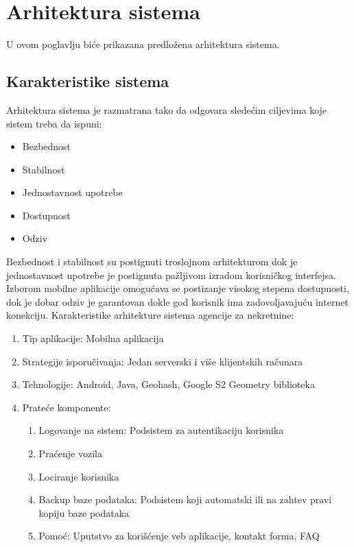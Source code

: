 \section{\bfseries Arhitektura sistema}

U ovom poglavlju biće prikazana predložena arhitektura sistema.

\subsection{\bfseries Karakteristike sistema}

Arhitektura sistema je razmatrana tako da odgovara sledećim ciljevima koje sistem treba da ispuni:
\begin{itemize}
    \item Bezbednost
    \item Stabilnost
    \item Jednostavnost upotrebe
    \item Dostupnost
    \item Odziv
\end{itemize}
Bezbednost i stabilnost su postignuti troslojnom arhitekturom dok je jednostavnost upotrebe je postignuta pažljivom izradom korisničkog interfejsa. Izborom mobilne aplikacije omogućava se postizanje visokog stepena dostupnosti, dok je dobar odziv je garantovan dokle god korisnik ima zadovoljavajuću internet konekciju.
\newpage
Karakteristike arhitekture sistema agencije za nekretnine:
\begin{enumerate}
    \item Tip aplikacije: Mobilna aplikacija
    \item Strategije isporučivanja: Jedan serverski i više klijentskih računara
    \item Tehnologije: Android, Java, Geohash, Google S2 Geometry biblioteka
    \item Prateće komponente:
    \begin{enumerate}
        \item Logovanje na sistem: Podsistem za autentikaciju korisnika
        \item Praćenje vozila
        \item Lociranje korisnika
        \item Backup baze podataka: Podsistem koji automatski ili na zahtev pravi kopiju baze podataka
        \item Pomoć: Uputstvo za korišćenje veb aplikacije, kontakt forma, FAQ
    \end{enumerate}
\end{enumerate}

